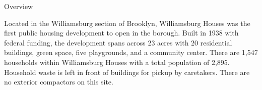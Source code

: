 Overview

Located in the Williamsburg section of Brooklyn, Williamsburg Houses was the first public housing development to open in the borough. Built in 1938 with federal funding, the development spans across 23 acres with 20 residential buildings, green space, five playgrounds, and a community center. There are 1,547 households within Williamsburg Houses with a total population of 2,895. Household waste is left in front of buildings for pickup by caretakers. There are no exterior compactors on this site. 